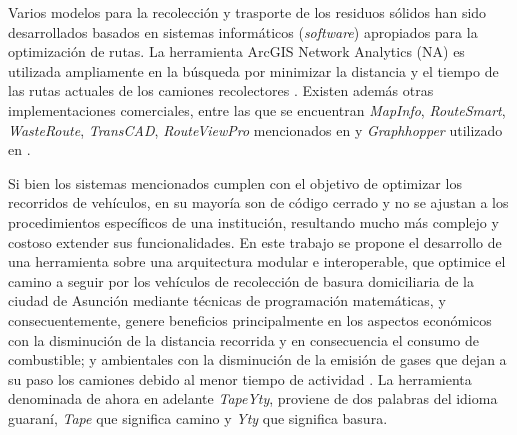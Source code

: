\documentclass[spanish, conference]{IEEEtran}
\begin{document}
Varios modelos para la recolección y trasporte de los residuos sólidos han sido desarrollados basados en sistemas informáticos (\textit{software}) apropiados para la optimización de rutas. La herramienta ArcGIS Network Analytics (NA) es utilizada ampliamente en la búsqueda por minimizar la distancia y el tiempo de las rutas actuales de los camiones recolectores \cite{Kallel2016UsingTunisia} \cite{Malakahmad2014SolidMalaysia}. Existen además otras implementaciones comerciales, entre las que se encuentran \textit{MapInfo}, \textit{RouteSmart}, \textit{WasteRoute}, \textit{TransCAD}, \textit{RouteViewPro} mencionados en \cite{Kallel2016UsingTunisia} y \textit{Graphhopper} utilizado en \cite{Lozano2018SmartOptimization}.

Si bien los sistemas mencionados cumplen con el objetivo de optimizar los recorridos de vehículos, en su mayoría son de código cerrado y no se ajustan a los procedimientos específicos de una institución, resultando mucho más complejo y costoso extender sus funcionalidades. En este trabajo se propone el desarrollo de una herramienta sobre una arquitectura modular e interoperable, que optimice el camino a seguir por los vehículos de recolección de basura domiciliaria de la ciudad de Asunción mediante técnicas de programación matemáticas, y consecuentemente, genere beneficios principalmente en los aspectos económicos con la disminución de la distancia recorrida y en consecuencia el consumo de combustible; y ambientales con la disminución de la emisión de gases que dejan a su paso los camiones debido al menor tiempo de actividad \cite{Vu2018ParameterModel}. La herramienta denominada de ahora en adelante \textit{TapeYty}, proviene de dos palabras del idioma guaraní, \textit{Tape} que significa camino y \textit{Yty} que significa basura.

\end{document}
